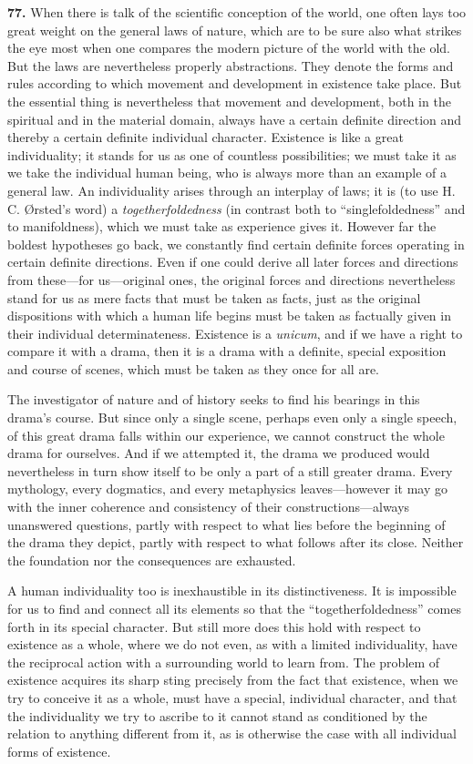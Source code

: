 \documentclass[12pt,a4paper]{book}
\newcommand{\opage}[1]{\marginnote{\footnotesize\textit{[#1]}}}
\begin{document}
\noindent\textbf{77.} When there is talk of the scientific conception of the world, one often lays too
great weight on the general laws of nature, which are to be sure also what strikes the eye most when one
compares the modern picture of the world with the old. But the laws are nevertheless properly abstractions.
They denote the forms and rules according to which movement and development in existence take place. But
the essential thing is nevertheless that movement and development, both in the spiritual and in the
material domain, always have a certain definite direction and thereby a certain definite individual
character. Existence is like a great individuality; it stands for us as one of countless possibilities; we
must take it as we take the individual human being, who is always more than an example of a general law. An
individuality arises through an interplay of laws; it is (to use H. C. Ørsted's word) a
\emph{togetherfoldedness} (in contrast both to ``singlefoldedness'' and to manifoldness), which we must
take as experience gives it. However far the boldest hypotheses go back, we 
\opage{179}constantly find certain definite
forces operating in certain definite directions. Even if one could derive all later forces and directions
from these---for us---original ones, the original forces and directions nevertheless stand for us as mere
facts that must be taken as facts, just as the original dispositions with which a human life begins must be
taken as factually given in their individual determinateness. Existence is a \textit{unicum}, and if we have
a right to compare it with a drama, then it is a drama with a definite, special exposition and course of
scenes, which must be taken as they once for all are.

The investigator of nature and of history seeks to find his bearings in this drama's course. But since only
a single scene, perhaps even only a single speech, of this great drama falls within our experience, we
cannot construct the whole drama for ourselves. And if we attempted it, the drama we produced would
nevertheless in turn show itself to be only a part of a still greater drama. Every mythology, every
dogmatics, and every metaphysics leaves---however it may go with the inner coherence and consistency of
their constructions---always unanswered questions, partly with respect to what lies before the beginning of
the drama they depict, partly with respect to what follows after its close. Neither the foundation nor the
consequences are exhausted.

A human individuality too is inexhaustible in its distinctiveness. It is impossible for us to find and
connect all its elements so that the ``togetherfoldedness'' comes forth in its special character. But still
more does this hold with respect to existence as a whole, where we do not even, as with a limited
individuality, have the reciprocal action with a surrounding world to learn from. The problem of existence
acquires its sharp sting precisely from the fact that existence, when we try to conceive it as a whole, must
have a special, individual character, and that the individuality we try to ascribe to it cannot stand as
conditioned by the relation to anything different from it, as is otherwise the case with all individual
forms of existence.
\end{document}
